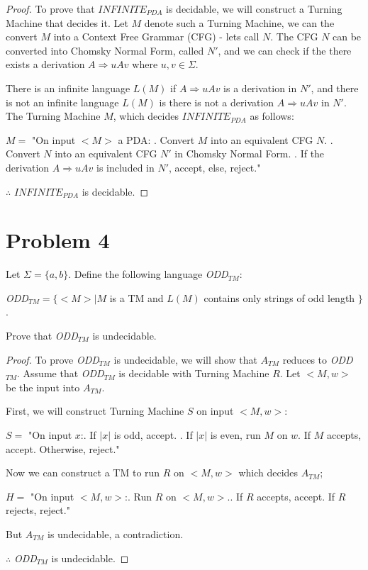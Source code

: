 \documentclass[11pt]{article}
\begin{document}
\begin{proof}
To prove that $INFINITE_{PDA}$ is decidable, we will construct a Turning Machine that decides it. Let $M$ denote such a Turning Machine, we can the convert $M$ into a Context Free Grammar (CFG) - lets call $N$.
The CFG $N$ can be converted into Chomsky Normal Form, called $N'$, and we can check if the there exists a derivation $A \Rightarrow uAv$ where $u,v \in \Sigma$.

\noindent
There is an infinite language $L(M)$ if $A \Rightarrow uAv$ is a derivation in $N'$, and there is not an infinite language $L(M)$ is there is not a derivation $A \Rightarrow uAv$ in $N'$. The Turning Machine $M$, which decides $INFINITE_{PDA}$ as follows:

\noindent
$M = $ "On input $<M>$ a PDA:
\newline
{}. Convert $M$ into an equivalent CFG $N$.
\newline
{}. Convert $N$ into an equivalent CFG $N'$ in Chomsky Normal Form.
\newline
{}. If the derivation $A \Rightarrow uAv$ is included in $N'$, accept, else, reject."

\noindent
$\therefore$  $INFINITE_{PDA}$ is decidable.
\end{proof}


\newpage
\section*{Problem 4}

Let $\Sigma=\{a,b\}$. Define the following language {\em ODD}$_{TM}$:

{\em ODD}$_{TM}=\{ <M>|M$ is a TM and $L(M)$ contains only strings of odd length $\}$.

\noindent
Prove that {\em ODD}$_{TM}$ is undecidable.

\begin{proof}
To prove {\em ODD}$_{TM}$ is undecidable, we will show that $A_{TM}$ reduces to {\em ODD}$_{TM}$. Assume that {\em ODD}$_{TM}$ is decidable with Turning Machine $R$. Let $< M , w >$ be the input into $A_{TM}$.

\noindent
First, we will construct Turning Machine $S$ on input $< M , w >$:

\noindent
$S = $ "On input $x$:. If $|x|$ is odd, accept. . If $|x|$ is even, run $M$ on $w$. If $M$ accepts, accept. Otherwise, reject."

\noindent
Now we can construct a TM to run $R$ on $< M , w >$ which decides $A_{TM}$;

\noindent
$H = $ "On input $< M , w >$:. Run $R$ on $< M , w >$.. If $R$ accepts, accept. If $R$ rejects, reject."

\noindent But $A_{TM}$ is undecidable, a contradiction.

\noindent $\therefore$ {\em ODD}$_{TM}$ is undecidable.
\end{proof}
\end{document}
